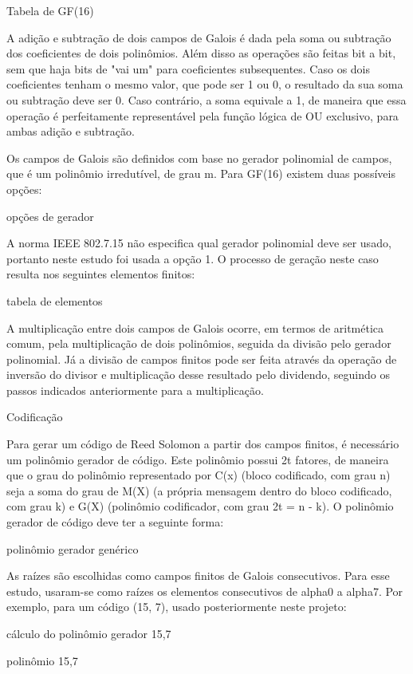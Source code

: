 	Tabela de GF(16)
	
	A adição e subtração de dois campos de Galois é dada pela soma ou subtração dos coeficientes de dois polinômios. Além disso as operações são feitas bit a bit, sem que haja bits de "vai um" para coeficientes subsequentes. Caso os dois coeficientes tenham o mesmo valor, que pode ser 1 ou 0, o resultado da sua soma ou subtração deve ser 0. Caso contrário, a soma equivale a 1, de maneira que essa operação é perfeitamente representável pela função lógica de OU exclusivo, para ambas adição e subtração.
	
	Os campos de Galois são definidos com base no gerador polinomial de campos, que é um polinômio irredutível, de grau m. Para GF(16) existem duas possíveis opções:
	
	opções de gerador
	
	A norma IEEE 802.7.15 não especifica qual gerador polinomial deve ser usado, portanto neste estudo foi usada a opção 1. O processo de geração neste caso resulta nos seguintes elementos finitos:
	 
	 tabela de elementos
	 
	A multiplicação entre dois campos de Galois ocorre, em termos de aritmética comum, pela multiplicação de dois polinômios, seguida da divisão pelo gerador polinomial. Já a divisão  de campos finitos pode ser feita através da operação de inversão do divisor e multiplicação desse resultado pelo dividendo, seguindo os passos indicados anteriormente para a multiplicação. 
	 
	 Codificação 
	 
	Para gerar um código de Reed Solomon a partir dos campos finitos, é necessário um polinômio gerador de código. Este polinômio possui 2t fatores, de maneira que o grau do polinômio representado por C(x) (bloco codificado, com grau n) seja a soma do grau de M(X) (a própria mensagem dentro do bloco codificado, com grau k) e G(X) (polinômio codificador, com grau 2t = n - k). O polinômio gerador de código deve ter a seguinte forma:
	 
	 polinômio gerador genérico
	 
	As raízes são escolhidas como campos finitos de Galois consecutivos. Para esse estudo, usaram-se como raízes os elementos consecutivos de alpha0 a alpha7. Por exemplo, para um código (15, 7), usado posteriormente neste projeto:
	 
	cálculo do polinômio gerador 15,7
	 
	polinômio 15,7
	 
